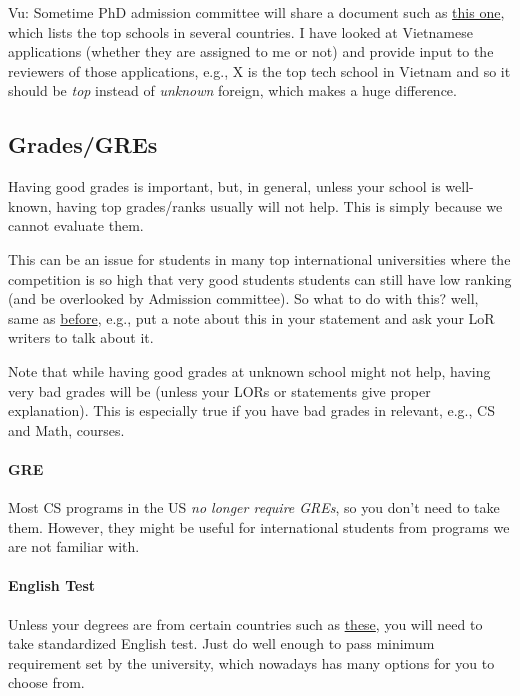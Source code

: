 \documentclass[11pt]{article}
\newenvironment{commentbox}{
 \small
    \begin{cbox}
 }{
   \end{cbox}
}
\newcommand{\red}[1]{{\color{red}{#1}}}
\begin{document}
\begin{commentbox}
Vu: Sometime PhD admission committee will share a document such as \href{https://github.com/dynaroars/dynaroars.github.io/wiki/Foreign-Top-Schools}{this one}, which lists the top schools in several countries. I have looked at Vietnamese applications (whether they are assigned to me or not) and provide input to the reviewers of those applications, e.g., X is the top tech school in Vietnam and so it should be \emph{top} instead of \emph{unknown} foreign, which makes a huge difference.
\end{commentbox}

\subsection{Grades/GREs}\label{sec:grades}
Having good grades is important, but, in general, unless your school is well-known, having top grades/ranks
usually will not help. This is simply because we cannot evaluate them.

This can be an issue for students in many top international universities where the competition is so high that very good students students can still have low ranking (and be overlooked by Admission committee).
So what to do with this? well, same as \hyperref[sec:your-school]{before}, e.g., put a note about this in your statement and ask your LoR writers to talk about it.

Note that while having good grades at unknown school might not help,
having very bad grades will be \red{red flag} (unless your LORs or
statements give proper explanation). This is especially true if you
have bad grades in relevant, e.g., CS and Math, courses.

\paragraph{GRE} Most CS programs in the US \emph{no longer require GREs}, so you don't need to
take them. However, they might be useful for international students from programs we are not familiar with. 

\paragraph{English Test} Unless your degrees are from certain countries such as \href{https://github.com/dynaroars/dynaroars.github.io/wiki/About-GMU#standard-tests-waiver-eligible-countries}{these}, you will need to
take standardized English test. Just do well enough to pass minimum requirement set by the university, which nowadays has many options for you to choose from.
\end{document}
